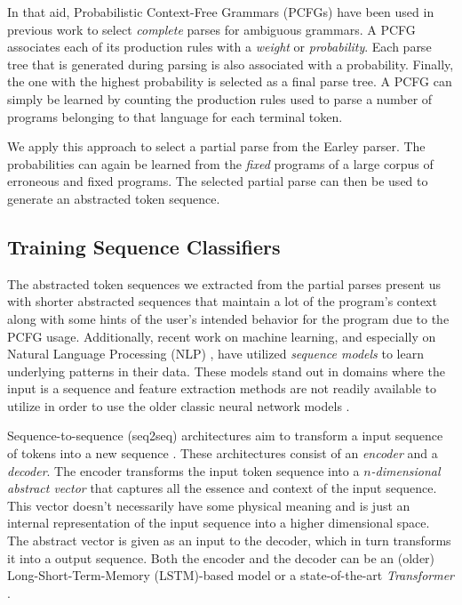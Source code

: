 In that aid, Probabilistic Context-Free Grammars (PCFGs) have been used in
previous work \citep{Collins_2013, Jelinek_1992} to select \emph{complete}
parses for ambiguous grammars. A PCFG associates each of its production rules
with a \emph{weight} or \emph{probability}. Each parse tree that is generated
during parsing is also associated with a probability. Finally, the one with the
highest probability is selected as a final parse tree. A PCFG can simply be
learned \citep{Collins_2013} by counting the production rules used to parse a
number of programs belonging to that language for each terminal token.

We apply this approach to select a partial parse from the Earley parser. The
probabilities can again be learned from the \emph{fixed} programs of a large
corpus of erroneous and fixed programs. The selected partial parse can then be
used to generate an abstracted token sequence.


\subsection{Training Sequence Classifiers}
\label{sec:overview:train}
The abstracted token sequences we extracted from the partial parses present us
with shorter abstracted sequences that maintain a lot of the program's context
along with some hints of the user's intended behavior for the program due to the
PCFG usage. Additionally, recent work on machine learning, and especially on
Natural Language Processing (NLP) \citep{Sutskever_2014, Hardalov_2018}, have
utilized \emph{sequence models} to learn underlying patterns in their data.
These models stand out in domains where the input is a sequence and feature
extraction methods are not readily available to utilize in order to use the
older classic neural network models \citep{Sutskever_2014}.

 Sequence-to-sequence (seq2seq) architectures aim to
transform a input sequence of tokens into a new sequence \citep{Sutskever_2014}.
These architectures consist of an \emph{encoder} and a \emph{decoder}. The
encoder transforms the input token sequence into a \emph{$n$-dimensional
abstract vector} that captures all the essence and context of the input
sequence. This vector doesn't necessarily have some physical meaning and is just
an internal representation of the input sequence into a higher dimensional
space. The abstract vector is given as an input to the decoder, which in turn
transforms it into a output sequence. Both the encoder and the decoder can be an
(older) Long-Short-Term-Memory (LSTM)-based model \citep{Hochreiter_1997} or a
state-of-the-art \emph{Transformer} \citep{Vaswani_2017}.

